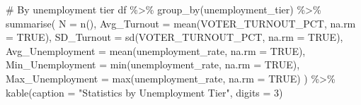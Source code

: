 \documentclass[
  11pt,
]{article}
\newenvironment{Shaded}{\begin{snugshade}}{\end{snugshade}}
\newcommand{\AttributeTok}[1]{\textcolor[rgb]{0.40,0.45,0.13}{#1}}
\newcommand{\CommentTok}[1]{\textcolor[rgb]{0.37,0.37,0.37}{#1}}
\newcommand{\ConstantTok}[1]{\textcolor[rgb]{0.56,0.35,0.01}{#1}}
\newcommand{\DecValTok}[1]{\textcolor[rgb]{0.68,0.00,0.00}{#1}}
\newcommand{\FunctionTok}[1]{\textcolor[rgb]{0.28,0.35,0.67}{#1}}
\newcommand{\NormalTok}[1]{\textcolor[rgb]{0.00,0.23,0.31}{#1}}
\newcommand{\SpecialCharTok}[1]{\textcolor[rgb]{0.37,0.37,0.37}{#1}}
\newcommand{\StringTok}[1]{\textcolor[rgb]{0.13,0.47,0.30}{#1}}
\begin{document}
\begin{Shaded}
\begin{Highlighting}[]
\CommentTok{\# By unemployment tier}
\NormalTok{df }\SpecialCharTok{\%\textgreater{}\%}
  \FunctionTok{group\_by}\NormalTok{(unemployment\_tier) }\SpecialCharTok{\%\textgreater{}\%}
  \FunctionTok{summarise}\NormalTok{(}
    \AttributeTok{N =} \FunctionTok{n}\NormalTok{(),}
    \AttributeTok{Avg\_Turnout =} \FunctionTok{mean}\NormalTok{(VOTER\_TURNOUT\_PCT, }\AttributeTok{na.rm =} \ConstantTok{TRUE}\NormalTok{),}
    \AttributeTok{SD\_Turnout =} \FunctionTok{sd}\NormalTok{(VOTER\_TURNOUT\_PCT, }\AttributeTok{na.rm =} \ConstantTok{TRUE}\NormalTok{),}
    \AttributeTok{Avg\_Unemployment =} \FunctionTok{mean}\NormalTok{(unemployment\_rate, }\AttributeTok{na.rm =} \ConstantTok{TRUE}\NormalTok{),}
    \AttributeTok{Min\_Unemployment =} \FunctionTok{min}\NormalTok{(unemployment\_rate, }\AttributeTok{na.rm =} \ConstantTok{TRUE}\NormalTok{),}
    \AttributeTok{Max\_Unemployment =} \FunctionTok{max}\NormalTok{(unemployment\_rate, }\AttributeTok{na.rm =} \ConstantTok{TRUE}\NormalTok{)}
\NormalTok{  ) }\SpecialCharTok{\%\textgreater{}\%}
  \FunctionTok{kable}\NormalTok{(}\AttributeTok{caption =} \StringTok{"Statistics by Unemployment Tier"}\NormalTok{, }\AttributeTok{digits =} \DecValTok{3}\NormalTok{)}
\end{Highlighting}
\end{Shaded}
\end{document}
